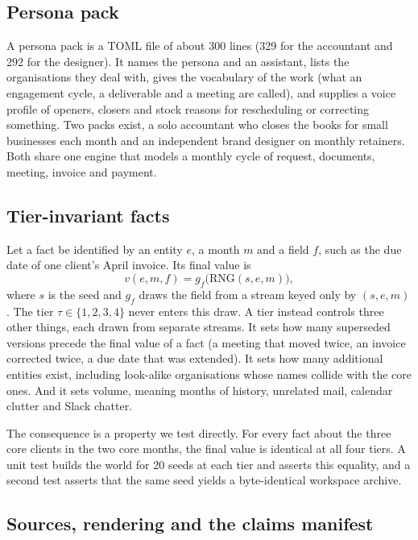 \documentclass{article}
\begin{document}
\subsection{Persona pack}

A persona pack is a TOML file of about 300 lines (329 for the accountant and 292 for the designer). It names the persona and an assistant, lists the organisations they deal with, gives the vocabulary of the work (what an engagement cycle, a deliverable and a meeting are called), and supplies a voice profile of openers, closers and stock reasons for rescheduling or correcting something. Two packs exist, a solo accountant who closes the books for small businesses each month and an independent brand designer on monthly retainers. Both share one engine that models a monthly cycle of request, documents, meeting, invoice and payment.

\subsection{Tier-invariant facts}

Let a fact be identified by an entity $e$, a month $m$ and a field $f$, such as the due date of one client's April invoice. Its final value is
\begin{equation}
  v(e, m, f) = g_f\bigl(\mathrm{RNG}(s, e, m)\bigr),
\end{equation}
where $s$ is the seed and $g_f$ draws the field from a stream keyed only by $(s, e, m)$. The tier $\tau \in \{1,2,3,4\}$ never enters this draw. A tier instead controls three other things, each drawn from separate streams. It sets how many superseded versions precede the final value of a fact (a meeting that moved twice, an invoice corrected twice, a due date that was extended). It sets how many additional entities exist, including look-alike organisations whose names collide with the core ones. And it sets volume, meaning months of history, unrelated mail, calendar clutter and Slack chatter.

The consequence is a property we test directly. For every fact about the three core clients in the two core months, the final value is identical at all four tiers. A unit test builds the world for 20 seeds at each tier and asserts this equality, and a second test asserts that the same seed yields a byte-identical workspace archive.

\subsection{Sources, rendering and the claims manifest}
\label{sec:sources}
\end{document}

